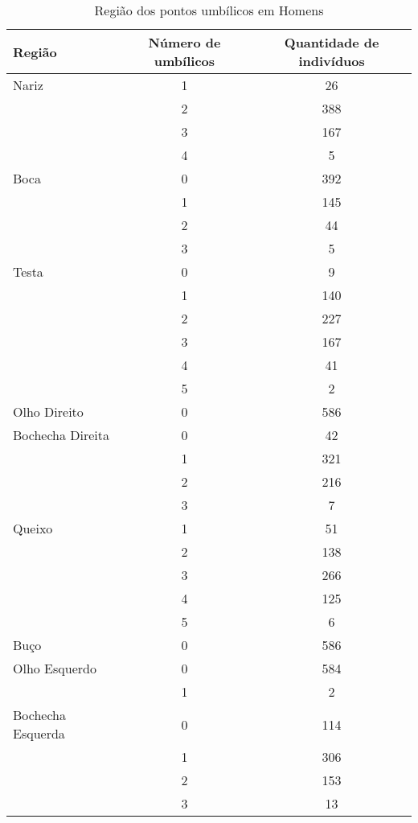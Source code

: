 \documentclass[a4paper,12pt]{article}
\begin{document}
\begin{table}[h!]
\centering
\caption{Região dos pontos umbílicos em Homens}
\begin{tabular}{l c c}
\hline
\textbf{Região} & \textbf{Número de umbílicos} & \textbf{Quantidade de indivíduos} \\
\hline
Nariz & 1 & 26 \\
      & 2 & 388 \\
      & 3 & 167 \\
      & 4 & 5 \\
\hline
Boca  & 0 & 392 \\
      & 1 & 145 \\
      & 2 & 44 \\
      & 3 & 5 \\
\hline
Testa & 0 & 9 \\
      & 1 & 140 \\
      & 2 & 227 \\
      & 3 & 167 \\
      & 4 & 41 \\
      & 5 & 2 \\
\hline
Olho Direito & 0 & 586 \\
\hline
Bochecha Direita & 0 & 42 \\
                 & 1 & 321 \\
                 & 2 & 216 \\
                 & 3 & 7 \\
\hline
Queixo & 1 & 51 \\
       & 2 & 138 \\
       & 3 & 266 \\
       & 4 & 125 \\
       & 5 & 6 \\
\hline
Buço & 0 & 586 \\
\hline
Olho Esquerdo & 0 & 584 \\
              & 1 & 2 \\
\hline
Bochecha Esquerda & 0 & 114 \\
                  & 1 & 306 \\
                  & 2 & 153 \\
                  & 3 & 13 \\
\hline
\end{tabular}
\end{table}
\end{document}
